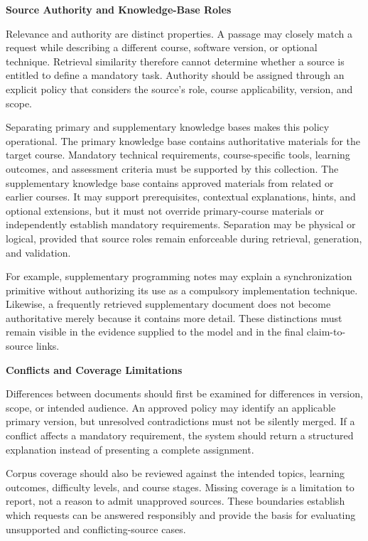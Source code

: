\documentclass[12pt,a4paper]{report}
\numberwithin{equation}{chapter}
\begin{document}
\par\medskip
\textbf{Source Authority and Knowledge-Base Roles}

Relevance and authority are distinct properties. A passage may closely match a request while describing a different course, software version, or optional technique. Retrieval similarity therefore cannot determine whether a source is entitled to define a mandatory task. Authority should be assigned through an explicit policy that considers the source's role, course applicability, version, and scope.

Separating primary and supplementary knowledge bases makes this policy operational. The primary knowledge base contains authoritative materials for the target course. Mandatory technical requirements, course-specific tools, learning outcomes, and assessment criteria must be supported by this collection. The supplementary knowledge base contains approved materials from related or earlier courses. It may support prerequisites, contextual explanations, hints, and optional extensions, but it must not override primary-course materials or independently establish mandatory requirements. Separation may be physical or logical, provided that source roles remain enforceable during retrieval, generation, and validation.

For example, supplementary programming notes may explain a synchronization primitive without authorizing its use as a compulsory implementation technique. Likewise, a frequently retrieved supplementary document does not become authoritative merely because it contains more detail. These distinctions must remain visible in the evidence supplied to the model and in the final claim-to-source links.

\par\medskip
\textbf{Conflicts and Coverage Limitations}

Differences between documents should first be examined for differences in version, scope, or intended audience. An approved policy may identify an applicable primary version, but unresolved contradictions must not be silently merged. If a conflict affects a mandatory requirement, the system should return a structured explanation instead of presenting a complete assignment.

Corpus coverage should also be reviewed against the intended topics, learning outcomes, difficulty levels, and course stages. Missing coverage is a limitation to report, not a reason to admit unapproved sources. These boundaries establish which requests can be answered responsibly and provide the basis for evaluating unsupported and conflicting-source cases.
\end{document}
